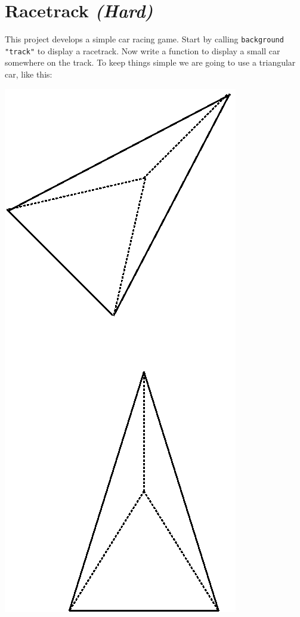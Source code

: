 \documentclass[12pt,a4paper,twoside]{article}
\renewcommand{\_}{\texttt{\symbol{95}}}
\begin{document}
\newpage
\section{Racetrack \it{(Hard)}}

This project develops a simple car racing game. Start by calling
\verb^background "track"^ to display a racetrack. Now write a function
to display a small car somewhere on the track. To keep things simple
we are going to use a triangular car, like this:

\begin{center}
\includegraphics[scale=0.32,angle=-90,trim=20mm 20mm 145mm 140mm]{diagrams/car}
\end{center}
\end{document}
